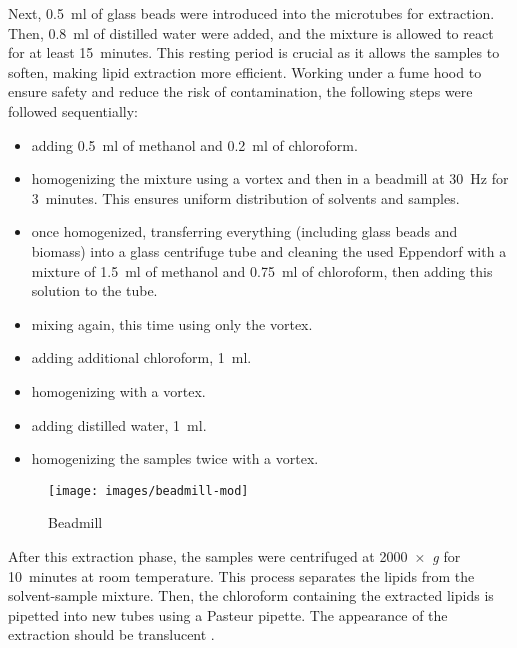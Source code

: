Next, \qty{0.5}{\milli\litre} of glass beads were introduced into the microtubes for extraction. Then, \qty{0.8}{\milli\litre} of distilled water were added, and the mixture is allowed to react for at least \qty{15}{minutes}. This resting period is crucial as it allows the samples to soften, making lipid extraction more efficient. Working under a fume hood to ensure safety and reduce the risk of contamination, the following steps were followed sequentially:
\begin{itemize}
\item adding \qty{0,5}{\milli\litre} of methanol and \qty{0,2}{\milli\litre} of chloroform.
\item homogenizing the mixture using a vortex and then in a beadmill  at \qty{30}{\hertz} for \qty{3}{minutes}. This ensures uniform distribution of solvents and samples.
\item once homogenized, transferring everything (including glass beads and biomass) into a glass centrifuge tube and cleaning the used Eppendorf with a mixture of \qty{1,5}{\milli\litre} of methanol and \qty{0,75}{\milli\litre} of chloroform, then adding this solution to the tube.
\item mixing again, this time using only the vortex.
\item adding additional chloroform, \qty{1}{\milli\litre}.
\item homogenizing with a vortex.
\item adding distilled water, \qty{1}{\milli\litre}.
\item homogenizing the samples twice with a vortex.
\end{itemize}

\begin{figure}[H]
	\centering
	\texttt{[image: images/beadmill-mod]}
	\caption{Beadmill}
	\label{fig:beadmill}
\end{figure}

After this extraction phase, the samples were centrifuged at 2000~×~\textsl{g}
for \qty{10}{minutes} at room temperature. This process separates the lipids from the solvent-sample mixture. Then, the chloroform containing the extracted lipids is pipetted into new tubes using a Pasteur pipette. The appearance of the extraction should be translucent .

